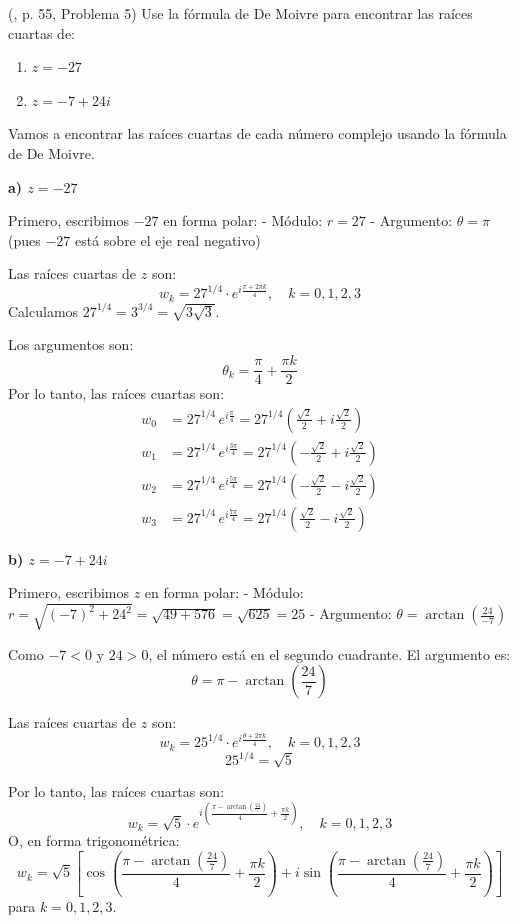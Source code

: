 \begin{prob} (\cite{andreescu2014complex}, p. 55, Problema 5) Use la fórmula de De Moivre para encontrar las raíces cuartas de:
\begin{multicols}{2}
\begin{enumerate}[$a)$]
\item $z=-27$
\item $z=-7+24i$
\end{enumerate}
\end{multicols}
\begin{myproof}
Vamos a encontrar las raíces cuartas de cada número complejo usando la fórmula de De Moivre.

\textbf{a) $z = -27$}

Primero, escribimos $-27$ en forma polar:
- Módulo: $r = 27$
- Argumento: $\theta = \pi$ (pues $-27$ está sobre el eje real negativo)

Las raíces cuartas de $z$ son:
\[
w_k = 27^{1/4} \cdot e^{i\frac{\pi + 2\pi k}{4}}, \quad k = 0,1,2,3
\]
Calculamos $27^{1/4} = 3^{3/4} = \sqrt{3\sqrt{3}}$.

Los argumentos son:
\[
\theta_k = \frac{\pi}{4} + \frac{\pi k}{2}
\]
Por lo tanto, las raíces cuartas son:
\[
\boxed{
\begin{aligned}
w_0 &= 27^{1/4} \, e^{i\frac{\pi}{4}} = 27^{1/4} \left(\frac{\sqrt{2}}{2} + i\frac{\sqrt{2}}{2}\right) \\
w_1 &= 27^{1/4} \, e^{i\frac{3\pi}{4}} = 27^{1/4} \left(-\frac{\sqrt{2}}{2} + i\frac{\sqrt{2}}{2}\right) \\
w_2 &= 27^{1/4} \, e^{i\frac{5\pi}{4}} = 27^{1/4} \left(-\frac{\sqrt{2}}{2} - i\frac{\sqrt{2}}{2}\right) \\
w_3 &= 27^{1/4} \, e^{i\frac{7\pi}{4}} = 27^{1/4} \left(\frac{\sqrt{2}}{2} - i\frac{\sqrt{2}}{2}\right)
\end{aligned}
}
\]

\vspace{1em}

\textbf{b) $z = -7 + 24i$}

Primero, escribimos $z$ en forma polar:
- Módulo: $r = \sqrt{(-7)^2 + 24^2} = \sqrt{49 + 576} = \sqrt{625} = 25$
- Argumento: $\theta = \arctan\left(\frac{24}{-7}\right)$

Como $-7 < 0$ y $24 > 0$, el número está en el segundo cuadrante. El argumento es:
\[
\theta = \pi - \arctan\left(\frac{24}{7}\right)
\]

Las raíces cuartas de $z$ son:
\[
w_k = 25^{1/4} \cdot e^{i\frac{\theta + 2\pi k}{4}}, \quad k = 0,1,2,3
\]
\[
25^{1/4} = \sqrt{5}
\]

Por lo tanto, las raíces cuartas son:
\[
\boxed{
w_k = \sqrt{5} \cdot e^{i\left(\frac{\pi - \arctan\left(\frac{24}{7}\right)}{4} + \frac{\pi k}{2}\right)}, \quad k = 0,1,2,3
}
\]
O, en forma trigonométrica:
\[
w_k = \sqrt{5} \left[ \cos\left(\frac{\pi - \arctan\left(\frac{24}{7}\right)}{4} + \frac{\pi k}{2} \right) + i \sin\left(\frac{\pi - \arctan\left(\frac{24}{7}\right)}{4} + \frac{\pi k}{2} \right) \right]
\]
para $k = 0,1,2,3$.

\end{myproof}

\end{prob}

